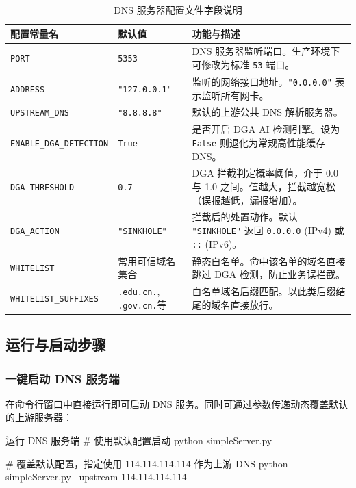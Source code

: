 \documentclass[11pt,a4paper]{ctexart}
\begin{document}
\begin{table}[H]
    \centering
    \color{Charcoal}
    \caption{DNS 服务器配置文件字段说明}
    \vspace{0.2cm}
    \begin{tabularx}{\textwidth}{lp{3cm}X}
        \toprule
        \textbf{配置常量名} & \textbf{默认值} & \textbf{功能与描述} \\
        \midrule
        \texttt{PORT} & \texttt{5353} & DNS 服务器监听端口。生产环境下可修改为标准 \texttt{53} 端口。 \\
        \texttt{ADDRESS} & \texttt{"127.0.0.1"} & 监听的网络接口地址。\texttt{"0.0.0.0"} 表示监听所有网卡。 \\
        \texttt{UPSTREAM\_DNS} & \texttt{"8.8.8.8"} & 默认的上游公共 DNS 解析服务器。 \\
        \texttt{ENABLE\_DGA\_DETECTION} & \texttt{True} & 是否开启 DGA AI 检测引擎。设为 \texttt{False} 则退化为常规高性能缓存 DNS。 \\
        \texttt{DGA\_THRESHOLD} & \texttt{0.7} & DGA 拦截判定概率阈值，介于 0.0 与 1.0 之间。值越大，拦截越宽松（误报越低，漏报增加）。 \\
        \texttt{DGA\_ACTION} & \texttt{"SINKHOLE"} & 拦截后的处置动作。默认 \texttt{"SINKHOLE"} 返回 \texttt{0.0.0.0} (IPv4) 或 \texttt{::} (IPv6)。 \\
        \texttt{WHITELIST} & 常用可信域名集合 & 静态白名单。命中该名单的域名直接跳过 DGA 检测，防止业务误拦截。 \\
        \texttt{WHITELIST\_SUFFIXES} & \texttt{.edu.cn.}, \texttt{.gov.cn.}等 & 白名单域名后缀匹配。以此类后缀结尾的域名直接放行。 \\
        \bottomrule
    \end{tabularx}
    \label{tab:configs}
\end{table}

\subsection{运行与启动步骤}

\subsubsection{一键启动 DNS 服务端}
在命令行窗口中直接运行即可启动 DNS 服务。同时可通过参数传递动态覆盖默认的上游服务器：
\begin{codecard}{运行 DNS 服务端}
# 使用默认配置启动
python simpleServer.py

# 覆盖默认配置，指定使用 114.114.114.114 作为上游 DNS
python simpleServer.py --upstream 114.114.114.114
\end{codecard}
\end{document}
